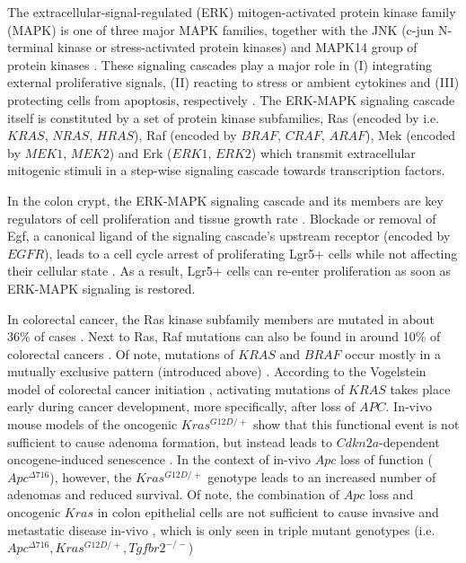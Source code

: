 \begin{flushleft}
The extracellular-signal-regulated (ERK) mitogen-activated protein kinase family (MAPK) is one of three major MAPK families, together with the JNK (c-jun N-terminal kinase or stress-activated protein kinases) and MAPK14 group of protein kinases \citep{zhangMAPKSignalPathways2002}. These signaling cascades play a major role in (I) integrating external proliferative signals, (II) reacting to stress or ambient cytokines and (III) protecting cells from apoptosis, respectively \citep{fangMAPKSignallingPathways2005}. The ERK-MAPK signaling cascade itself is constituted by a set of protein kinase subfamilies, Ras (encoded by i.e. $KRAS$, $NRAS$, $HRAS$), Raf (encoded by $BRAF$, $CRAF$, $ARAF$), Mek (encoded by $MEK1$, $MEK2$) and Erk ($ERK1$, $ERK2$) which transmit extracellular mitogenic stimuli in a step-wise signaling cascade towards transcription factors. \par

In the colon crypt, the ERK-MAPK signaling cascade and its members are key regulators of cell proliferation and tissue growth rate \citep{hTalesCryptNew2019}. Blockade or removal of Egf, a canonical ligand of the signaling cascade's upstream receptor (encoded by $EGFR$), leads to a cell cycle arrest of proliferating Lgr5+ cells while not affecting their cellular state \citep{basakInducedQuiescenceLgr52017}. As a result, Lgr5+ cells can re-enter proliferation as soon as ERK-MAPK signaling is restored.
\par

In colorectal cancer, the Ras kinase subfamily members are mutated in about 36\% of cases \citep{fangMAPKSignallingPathways2005}. Next to Ras, Raf mutations can also be found in around 10\% of colorectal cancers \citep{fangMAPKSignallingPathways2005}. Of note, mutations of $KRAS$ and $BRAF$ occur mostly in a mutually exclusive pattern (introduced above) \citep{fangMAPKSignallingPathways2005, minaConditionalSelectionGenomic2017}. According to the Vogelstein model of colorectal cancer initiation \citep{fearonMolecularGeneticsColorectal2011}, activating mutations of $KRAS$ takes place early during cancer development, more specifically, after loss of $APC$. In-vivo mouse models of the oncogenic $Kras^{G12D/+}$ show that this functional event is not sufficient to cause adenoma formation, but instead leads to $Cdkn2a$-dependent oncogene-induced senescence \citep{benneckeInk4aArfOncogeneinduced2010}. In the context of in-vivo $Apc$ loss of function ($Apc^{\Delta716}$), however, the $Kras^{G12D/+}$ genotype leads to an increased number of adenomas and reduced survival. Of note, the combination of $Apc$ loss and oncogenic $Kras$ in colon epithelial cells are not sufficient to cause invasive and metastatic disease in-vivo \citep{sakaiCombinedMutationApc2018a}, which is only seen in triple mutant genotypes (i.e. $Apc^{\Delta716}, Kras^{G12D/+}, Tgfbr2^{-/-}$) \citep{sakaiCombinedMutationApc2018a} 



\end{flushleft}
